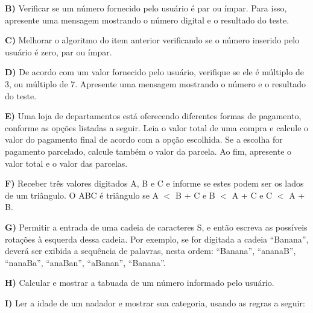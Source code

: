 \begin{DoxyItemize}
\item {\bfseries{B)}} Verificar se um número fornecido pelo usuário é par ou ímpar. Para isso, apresente uma mensagem mostrando o número digital e o resultado do teste.
\item {\bfseries{C)}} Melhorar o algoritmo do item anterior verificando se o número inserido pelo usuário é zero, par ou ímpar.
\item {\bfseries{D)}} De acordo com um valor fornecido pelo usuário, verifique se ele é múltiplo de 3, ou múltiplo de 7. Apresente uma mensagem mostrando o número e o resultado do teste.
\item {\bfseries{E)}} Uma loja de departamentos está oferecendo diferentes formas de pagamento, conforme as opções listadas a seguir. Leia o valor total de uma compra e calcule o valor do pagamento final de acordo com a opção escolhida. Se a escolha for pagamento parcelado, calcule também o valor da parcela. Ao fim, apresente o valor total e o valor das parcelas.
\end{DoxyItemize}


\begin{DoxyCode}{0}
\DoxyCodeLine{}
\DoxyCodeLine{}
\DoxyCodeLine{}
\end{DoxyCode}



\begin{DoxyItemize}
\item {\bfseries{F)}} Receber três valores digitados A, B e C e informe se estes podem ser os lados de um triângulo. O A\+BC é triângulo {\ttfamily se A $<$ B + C e B $<$ A + C e C $<$ A + B}.
\item {\bfseries{G)}} Permitir a entrada de uma cadeia de caracteres S, e então escreva as possíveis rotações à esquerda dessa cadeia. Por exemplo, se for digitada a cadeia {\ttfamily “\+Banana”}, deverá ser exibida a sequência de palavras, nesta ordem\+: {\ttfamily “\+Banana”}, {\ttfamily “anana\+B”}, {\ttfamily “nana\+Ba”}, {\ttfamily “ana\+Ban”}, {\ttfamily “a\+Banan”}, {\ttfamily “\+Banana”}.
\item {\bfseries{H)}} Calcular e mostrar a tabuada de um número informado pelo usuário.
\item {\bfseries{I)}} Ler a idade de um nadador e mostrar sua categoria, usando as regras a seguir\+:
\end{DoxyItemize}

